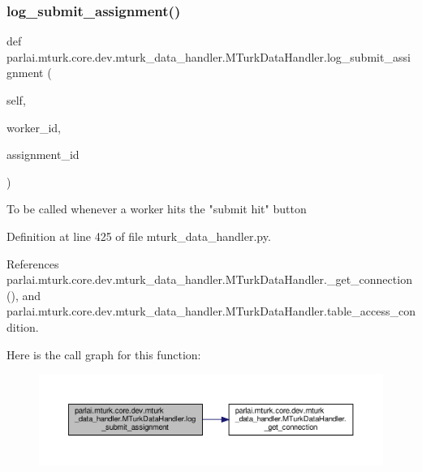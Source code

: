 \subsubsection{\texorpdfstring{log\+\_\+submit\+\_\+assignment()}{log\_submit\_assignment()}}
{\footnotesize\ttfamily def parlai.\+mturk.\+core.\+dev.\+mturk\+\_\+data\+\_\+handler.\+M\+Turk\+Data\+Handler.\+log\+\_\+submit\+\_\+assignment (\begin{DoxyParamCaption}\item[{}]{self,  }\item[{}]{worker\+\_\+id,  }\item[{}]{assignment\+\_\+id }\end{DoxyParamCaption})}

\begin{DoxyVerb}To be called whenever a worker hits the "submit hit" button\end{DoxyVerb}
 

Definition at line 425 of file mturk\+\_\+data\+\_\+handler.\+py.



References parlai.\+mturk.\+core.\+dev.\+mturk\+\_\+data\+\_\+handler.\+M\+Turk\+Data\+Handler.\+\_\+get\+\_\+connection(), and parlai.\+mturk.\+core.\+dev.\+mturk\+\_\+data\+\_\+handler.\+M\+Turk\+Data\+Handler.\+table\+\_\+access\+\_\+condition.

Here is the call graph for this function\+:
\nopagebreak
\begin{figure}[H]
\begin{center}
\leavevmode
\includegraphics[width=350pt]{classparlai_1_1mturk_1_1core_1_1dev_1_1mturk__data__handler_1_1MTurkDataHandler_a5a9a1246250044f6f13117c899285c82_cgraph}
\end{center}
\end{figure}
\mbox{\label{classparlai_1_1mturk_1_1core_1_1dev_1_1mturk__data__handler_1_1MTurkDataHandler_a7b7b243f1ae901dce38b639fb9dcde22}} 
